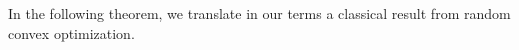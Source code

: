%
In the following theorem, we translate in our terms a classical result from random convex optimization.

